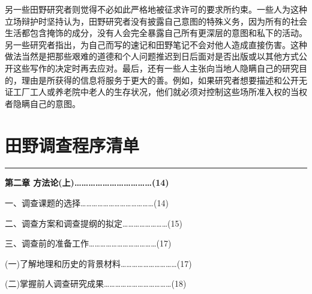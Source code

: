 \documentclass[12pt,a4paper]{article}
\begin{document}
另一些田野研究者则觉得不必如此严格地被征求许可的要求所约束。一些人为这种立场辩护时坚持认为，田野研究者没有披露自己意图的特殊义务，因为所有的社会生活都包含掩饰的成分，没有人会完全暴露自己所有更深层的意图和私下的活动。另一些研究者指出，为自己而写的速记和田野笔记不会对他人造成直接伤害。这种做法当然是把那些艰难的道德和个人问题推迟到日后面对是否出版或以其他方式公开这些写作的决定时再去应对。最后，还有一些人主张向当地人隐瞒自己的研究目的，理由是所获得的信息将服务于更大的善。例如，如果研究者想要描述和公开无证工厂工人或养老院中老人的生存状况，他们就必须对控制这些场所准入权的当权者隐瞒自己的意图。
\par{}
\newpage
\section{田野调查程序清单}
\vspace{0.5em}
\vspace{0.3em}

\noindent\rule{\textwidth}{0.4pt}

\vspace{0.3em}



\vspace{0.3em}\textbf{第二章 方法论(上)……………………………(14)}



\noindent\hspace{1em}一、调查课题的选择…………………………………(14)



\noindent\hspace{1em}二、调查方案和调查提纲的拟定……………………(15)



\noindent\hspace{1em}三、调查前的准备工作………………………………(17)



\noindent\hspace{2.5em}(一)了解地理和历史的背景材料…………………………(17)

\noindent\hspace{2.5em}(二)掌握前人调查研究成果………………………………(18)
\end{document}
